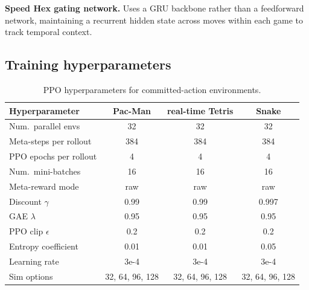 \documentclass{article}
\begin{document}
\textbf{Speed Hex gating network.}
Uses a GRU backbone rather than a feedforward network, maintaining a recurrent hidden
state across moves within each game to track temporal context.

\subsection{Training hyperparameters}

\begin{table}[h]
  \centering
  \caption{PPO hyperparameters for committed-action environments.}
  \label{tab:hparams}
  \begin{tabular}{lccc}
    \toprule
    Hyperparameter & Pac-Man & real-time Tetris & Snake \\
    \midrule
    Num.\ parallel envs     & 32   & 32   & 32   \\
    Meta-steps per rollout  & 384  & 384  & 384  \\
    PPO epochs per rollout  & 4    & 4    & 4    \\
    Num.\ mini-batches      & 16   & 16   & 16   \\
    Meta-reward mode        & raw  & raw  & raw  \\
    Discount $\gamma$       & 0.99 & 0.99 & 0.997 \\
    GAE $\lambda$           & 0.95 & 0.95 & 0.95 \\
    PPO clip $\epsilon$     & 0.2  & 0.2  & 0.2  \\
    Entropy coefficient     & 0.01 & 0.01 & 0.05 \\
    Learning rate           & 3e-4 & 3e-4 & 3e-4 \\
    Sim options             & 32, 64, 96, 128 & 32, 64, 96, 128 & 32, 64, 96, 128 \\
    \bottomrule
  \end{tabular}
\end{table}
\end{document}
